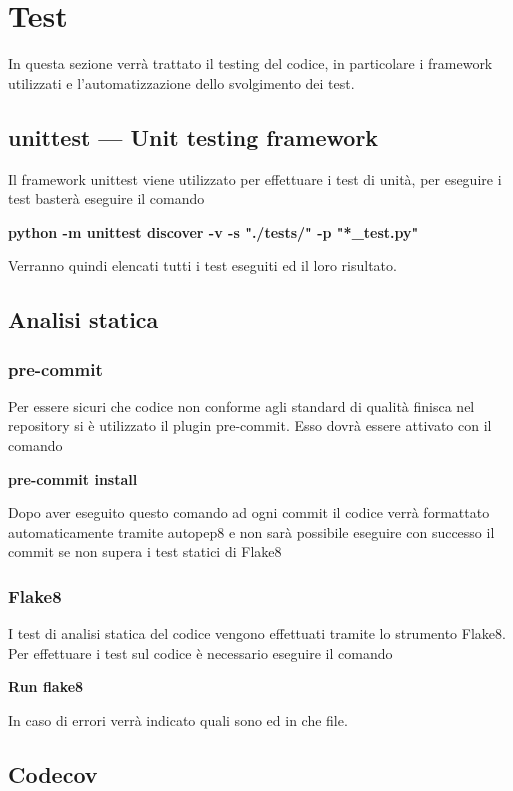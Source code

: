 \section{Test}

In questa sezione verrà trattato il testing del codice, in particolare i framework utilizzati e l'automatizzazione dello svolgimento dei test.

\subsection{unittest — Unit testing framework}

Il framework unittest viene utilizzato per effettuare i test di unità, per eseguire i test basterà eseguire il comando 

\centerline{ \textbf{python -m unittest discover -v -s "./tests/" -p "*\_test.py"}}

Verranno quindi elencati tutti i test eseguiti ed il loro risultato.


\subsection{Analisi statica}

\subsubsection{pre-commit}

Per essere sicuri che codice non conforme agli standard di qualità finisca nel repository si è utilizzato il plugin pre-commit. Esso dovrà essere attivato con il comando

\centerline{\textbf{pre-commit install}}

Dopo aver eseguito questo comando ad ogni commit il codice verrà formattato automaticamente tramite autopep8 e non sarà possibile eseguire con successo il commit se non supera i test statici di Flake8

\subsubsection{Flake8}

I test di analisi statica del codice vengono effettuati tramite lo strumento Flake8. Per effettuare i test sul codice è necessario eseguire il comando

\centerline{\textbf{Run flake8}}
In caso di errori verrà indicato quali sono ed in che file. 

\subsection{Codecov}

